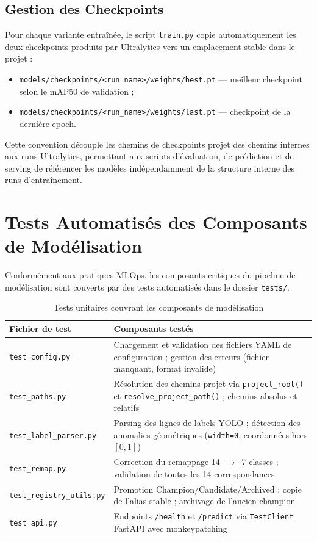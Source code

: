 \documentclass{rapportENSIAS}
\newcommand{\projectpath}[1]{\texttt{#1}}
\begin{document}
\subsection{Gestion des Checkpoints}

Pour chaque variante entraînée, le script \texttt{train.py} copie
automatiquement les deux checkpoints produits par Ultralytics vers un
emplacement stable dans le projet :

\begin{itemize}
    \item \texttt{models/checkpoints/<run\_name>/weights/best.pt}
          — meilleur checkpoint selon le mAP50 de validation ;
    \item \texttt{models/checkpoints/<run\_name>/weights/last.pt}
          — checkpoint de la dernière epoch.
\end{itemize}

Cette convention découple les chemins de checkpoints projet des chemins
internes aux runs Ultralytics, permettant aux scripts d'évaluation, de
prédiction et de serving de référencer les modèles indépendamment de la
structure interne des runs d'entraînement.

\section{Tests Automatisés des Composants de Modélisation}

Conformément aux pratiques MLOps, les composants critiques du pipeline
de modélisation sont couverts par des tests automatisés dans le dossier
\projectpath{tests/}.

\begin{table}[H]
\centering
\caption{Tests unitaires couvrant les composants de modélisation}
\label{tab:tests_modeling}
\begin{tabular}{p{4.5cm} p{9.5cm}}
\toprule
\textbf{Fichier de test} & \textbf{Composants testés} \\
\midrule
\texttt{test\_config.py}
  & Chargement et validation des fichiers YAML de configuration ;
    gestion des erreurs (fichier manquant, format invalide) \\
\texttt{test\_paths.py}
  & Résolution des chemins projet via \texttt{project\_root()} et
    \texttt{resolve\_project\_path()} ; chemins absolus et relatifs \\
\texttt{test\_label\_parser.py}
  & Parsing des lignes de labels YOLO ; détection des anomalies
    géométriques (\texttt{width=0}, coordonnées hors $[0,1]$) \\
\texttt{test\_remap.py}
  & Correction du remappage 14~$\rightarrow$~7 classes ;
    validation de toutes les 14 correspondances \\
\texttt{test\_registry\_utils.py}
  & Promotion Champion/Candidate/Archived ; copie de l'alias stable ;
    archivage de l'ancien champion \\
\texttt{test\_api.py}
  & Endpoints \texttt{/health} et \texttt{/predict} via
    \texttt{TestClient} FastAPI avec monkeypatching \\
\bottomrule
\end{tabular}
\end{table}
\end{document}
